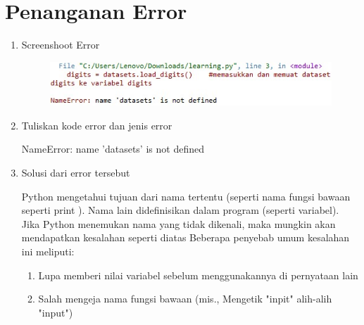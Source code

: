 \section{Penanganan Error}
\begin{enumerate}

\item Screenshoot Error
\begin{figure}[!htbp]
    \centering
    \includegraphics[scale=0.8]{figures/error.jpeg}
    \end{figure}
\item Tuliskan kode error dan jenis error
\par 
NameError: name 'datasets' is not defined
\item Solusi dari error tersebut
\par 
Python mengetahui tujuan dari nama tertentu (seperti nama fungsi bawaan seperti print ). Nama lain didefinisikan dalam program (seperti variabel). Jika Python menemukan nama yang tidak dikenali, maka mungkin akan mendapatkan kesalahan seperti diatas
Beberapa penyebab umum kesalahan ini meliputi:
\begin{enumerate}
\item Lupa memberi nilai variabel sebelum menggunakannya di pernyataan lain
\item Salah mengeja nama fungsi bawaan (mis., Mengetik "inpit" alih-alih "input")
\end{enumerate}
\end{enumerate}


